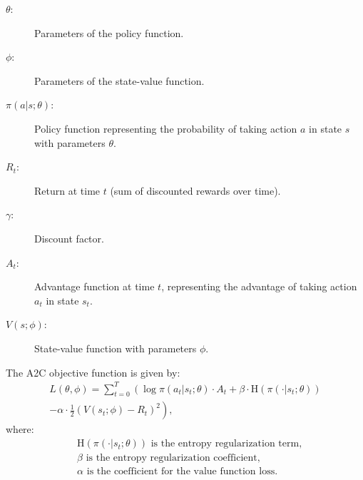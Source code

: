 \documentclass[lettersize,journal]{IEEEtran}
\begin{document}
\begin{description}
  \item[$\theta$:] Parameters of the policy function.
  \item[$\phi$:] Parameters of the state-value function.
  \item[$\pi(a|s;\theta)$:] Policy function representing the probability of taking action $a$ in state $s$ with parameters $\theta$.
  \item[$R_t$:] Return at time $t$ (sum of discounted rewards over time).
  \item[$\gamma$:] Discount factor.
  \item[$A_t$:] Advantage function at time $t$, representing the advantage of taking action $a_t$ in state $s_t$.
  \item[$V(s;\phi)$:] State-value function with parameters $\phi$.
\end{description}

The A2C objective function is given by:\\
  

\begin{multline}
L(\theta, \phi) = \sum_{t=0}^{T} \left( \log \pi(a_t|s_t;\theta) \cdot A_t + \beta \cdot \text{H}(\pi(\cdot|s_t;\theta)) \right. \\
\left. - \alpha \cdot \frac{1}{2} (V(s_t;\phi) - R_t)^2 \right),
\end{multline}
where:
\begin{align}
&\text{H}(\pi(\cdot|s_t;\theta)) \text{ is the entropy regularization term,} \\
&\beta \text{ is the entropy regularization coefficient,} \\
&\alpha \text{ is the coefficient for the value function loss.}
\end{align}
\end{document}
